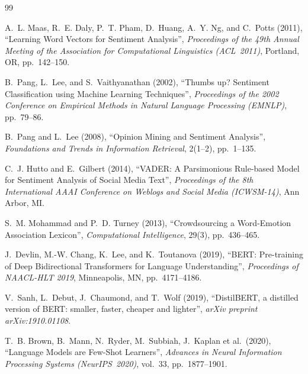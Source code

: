 \documentclass[12pt,reqno,twoside]{amsbook}
\theoremstyle{plain}
\numberwithin{equation}{chapter}
\numberwithin{section}{chapter}
\begin{document}
\renewcommand{\bibname}{References}
\def\bibindent{0.7cm}
\begin{thebibliography}{99\kern\bibindent}
\makeatletter
\let\old@biblabel\@biblabel
\def\@biblabel#1{\old@biblabel{#1}\kern\bibindent}
\let\old@bibitem\bibitem
\def\bibitem#1{\old@bibitem{#1}\leavevmode\kern-\bibindent}
\makeatother
\makeatletter
\renewcommand\@biblabel[1]{}
\makeatother

A.~L. Maas, R.~E. Daly, P.~T. Pham, D.~Huang, A.~Y. Ng, and C.~Potts (2011),
\textquotedblleft Learning Word Vectors for Sentiment Analysis\textquotedblright,
\textit{Proceedings of the 49th Annual Meeting of the Association for
Computational Linguistics (ACL~2011)}, Portland, OR, pp.~142--150.

B.~Pang, L.~Lee, and S.~Vaithyanathan (2002),
\textquotedblleft Thumbs up? Sentiment Classification using Machine Learning
Techniques\textquotedblright,
\textit{Proceedings of the 2002 Conference on Empirical Methods in Natural
Language Processing (EMNLP)}, pp.~79--86.

B.~Pang and L.~Lee (2008),
\textquotedblleft Opinion Mining and Sentiment Analysis\textquotedblright,
\textit{Foundations and Trends in Information Retrieval}, 2(1--2), pp.~1--135.

C.~J. Hutto and E.~Gilbert (2014),
\textquotedblleft VADER: A Parsimonious Rule-based Model for Sentiment Analysis
of Social Media Text\textquotedblright,
\textit{Proceedings of the 8th International AAAI Conference on Weblogs and
Social Media (ICWSM-14)}, Ann Arbor, MI.

S.~M. Mohammad and P.~D. Turney (2013),
\textquotedblleft Crowdsourcing a Word-Emotion Association
Lexicon\textquotedblright,
\textit{Computational Intelligence}, 29(3), pp.~436--465.

J.~Devlin, M.-W. Chang, K.~Lee, and K.~Toutanova (2019),
\textquotedblleft BERT: Pre-training of Deep Bidirectional Transformers for
Language Understanding\textquotedblright,
\textit{Proceedings of NAACL-HLT 2019}, Minneapolis, MN, pp.~4171--4186.

V.~Sanh, L.~Debut, J.~Chaumond, and T.~Wolf (2019),
\textquotedblleft DistilBERT, a distilled version of BERT: smaller, faster,
cheaper and lighter\textquotedblright,
\textit{arXiv preprint arXiv:1910.01108}.

T.~B. Brown, B.~Mann, N.~Ryder, M.~Subbiah, J.~Kaplan et al.\ (2020),
\textquotedblleft Language Models are Few-Shot Learners\textquotedblright,
\textit{Advances in Neural Information Processing Systems (NeurIPS~2020)},
vol.~33, pp.~1877--1901.


\end{thebibliography}
\end{document}
